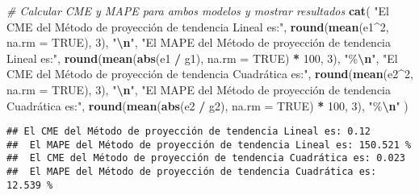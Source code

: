 \documentclass[
]{article}
\newenvironment{Shaded}{\begin{snugshade}}{\end{snugshade}}
\newcommand{\AttributeTok}[1]{\textcolor[rgb]{0.13,0.29,0.53}{#1}}
\newcommand{\CommentTok}[1]{\textcolor[rgb]{0.56,0.35,0.01}{\textit{#1}}}
\newcommand{\ConstantTok}[1]{\textcolor[rgb]{0.56,0.35,0.01}{#1}}
\newcommand{\DecValTok}[1]{\textcolor[rgb]{0.00,0.00,0.81}{#1}}
\newcommand{\FunctionTok}[1]{\textcolor[rgb]{0.13,0.29,0.53}{\textbf{#1}}}
\newcommand{\NormalTok}[1]{#1}
\newcommand{\SpecialCharTok}[1]{\textcolor[rgb]{0.81,0.36,0.00}{\textbf{#1}}}
\newcommand{\StringTok}[1]{\textcolor[rgb]{0.31,0.60,0.02}{#1}}
\begin{document}
\begin{Shaded}
\begin{Highlighting}[]
\CommentTok{\# Calcular CME y MAPE para ambos modelos y mostrar resultados}
\FunctionTok{cat}\NormalTok{(}
  \StringTok{"El CME del Método de proyección de tendencia Lineal es:"}\NormalTok{, }\FunctionTok{round}\NormalTok{(}\FunctionTok{mean}\NormalTok{(e1}\SpecialCharTok{\^{}}\DecValTok{2}\NormalTok{, }\AttributeTok{na.rm =} \ConstantTok{TRUE}\NormalTok{), }\DecValTok{3}\NormalTok{), }\StringTok{"}\SpecialCharTok{\textbackslash{}n}\StringTok{"}\NormalTok{,}
  \StringTok{"El MAPE del Método de proyección de tendencia Lineal es:"}\NormalTok{, }\FunctionTok{round}\NormalTok{(}\FunctionTok{mean}\NormalTok{(}\FunctionTok{abs}\NormalTok{(e1 }\SpecialCharTok{/}\NormalTok{ g1), }\AttributeTok{na.rm =} \ConstantTok{TRUE}\NormalTok{) }\SpecialCharTok{*} \DecValTok{100}\NormalTok{, }\DecValTok{3}\NormalTok{), }\StringTok{"\%}\SpecialCharTok{\textbackslash{}n}\StringTok{"}\NormalTok{,}
  \StringTok{"El CME del Método de proyección de tendencia Cuadrática es:"}\NormalTok{, }\FunctionTok{round}\NormalTok{(}\FunctionTok{mean}\NormalTok{(e2}\SpecialCharTok{\^{}}\DecValTok{2}\NormalTok{, }\AttributeTok{na.rm =} \ConstantTok{TRUE}\NormalTok{), }\DecValTok{3}\NormalTok{), }\StringTok{"}\SpecialCharTok{\textbackslash{}n}\StringTok{"}\NormalTok{,}
  \StringTok{"El MAPE del Método de proyección de tendencia Cuadrática es:"}\NormalTok{, }\FunctionTok{round}\NormalTok{(}\FunctionTok{mean}\NormalTok{(}\FunctionTok{abs}\NormalTok{(e2 }\SpecialCharTok{/}\NormalTok{ g2), }\AttributeTok{na.rm =} \ConstantTok{TRUE}\NormalTok{) }\SpecialCharTok{*} \DecValTok{100}\NormalTok{, }\DecValTok{3}\NormalTok{), }\StringTok{"\%}\SpecialCharTok{\textbackslash{}n}\StringTok{"}
\NormalTok{)}
\end{Highlighting}
\end{Shaded}

\begin{verbatim}
## El CME del Método de proyección de tendencia Lineal es: 0.12 
##  El MAPE del Método de proyección de tendencia Lineal es: 150.521 %
##  El CME del Método de proyección de tendencia Cuadrática es: 0.023 
##  El MAPE del Método de proyección de tendencia Cuadrática es: 12.539 %
\end{verbatim}
\end{document}

